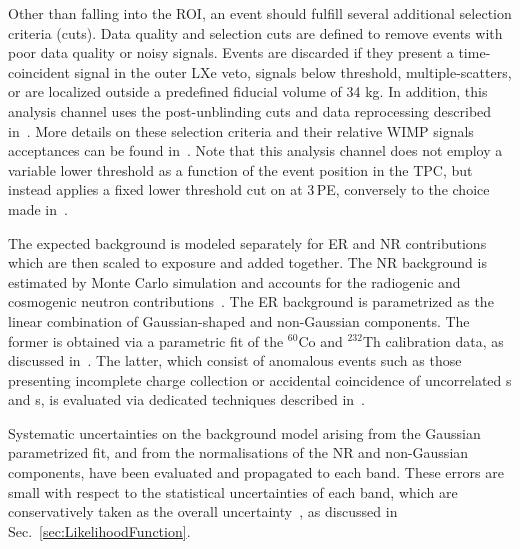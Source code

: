 Other than falling into the ROI, an event should fulfill several additional selection criteria (cuts). Data quality and selection cuts are defined to remove events with poor data quality or noisy signals. Events are discarded if they present a time-coincident signal in the outer LXe veto, \Sii{} signals below threshold, multiple-scatters, or are localized outside a predefined fiducial volume of 34 kg. In addition, this analysis channel uses the post-unblinding cuts and data reprocessing described in~\cite{xe100_run_combination}. More details on these selection criteria and their relative WIMP signals acceptances can be found in~\cite{Aprile:2012vw,xe100_run_combination}. 
Note that this analysis channel does not employ a variable lower \Si{} threshold as a function of the event position in the TPC, but instead applies a fixed lower threshold cut on \cSi{} at 3\,PE, conversely to the choice made in~\cite{xe100_run_combination}.

The expected background is modeled separately for ER and NR contributions which are then scaled to exposure and added together.
The NR background is estimated by Monte Carlo simulation and accounts for the radiogenic and cosmogenic neutron
contributions~\cite{Aprile:2013tov}. The ER background is parametrized as the linear combination of Gaussian-shaped and non-Gaussian components.
The former is obtained via a parametric fit of the $^{60}$Co and $^{232}$Th calibration data, as discussed in~\cite{xe100_run10_si}.
The latter, which consist of anomalous events such as those 
presenting incomplete charge collection or accidental coincidence of uncorrelated \Si{}s and \Sii{}s,  
is evaluated via dedicated techniques described in~\cite{xe100_run_combination}.

Systematic uncertainties on the background model arising from the Gaussian parametrized fit, and from the normalisations of the NR and non-Gaussian components, have been evaluated and propagated to each band. 
These errors are small with respect to the statistical uncertainties of each band, which are conservatively taken as the overall uncertainty~\cite{xe100_run_combination}, as discussed in Sec.~\ref{sec:LikelihoodFunction}.

